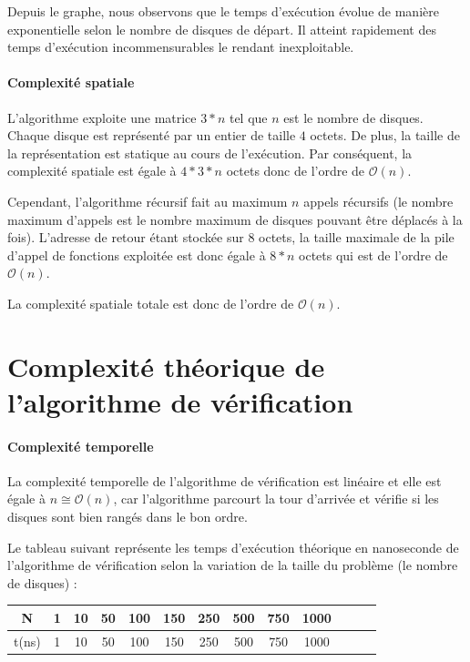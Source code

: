 Depuis le graphe, nous observons que le temps d'exécution évolue de manière exponentielle selon le nombre de disques de départ. Il atteint rapidement des temps d'exécution incommensurables le rendant inexploitable.

\paragraph{Complexité spatiale}
L'algorithme exploite une matrice $3 * n$ tel que $n$ est le nombre de disques. Chaque disque est représenté par un entier de taille $4$ octets. De plus, la taille de la représentation est statique au cours de l'exécution. Par conséquent, la complexité spatiale est égale à $4 * 3 * n$ octets donc de l'ordre de $\mathcal{O}(n)$.
\par
Cependant, l'algorithme récursif fait au maximum $n$ appels récursifs (le nombre maximum d'appels est le nombre maximum de disques pouvant être déplacés à la fois). L'adresse de retour étant stockée sur $8$ octets, la taille maximale de la pile d'appel de fonctions exploitée est donc égale à $8 * n$ octets qui est de l'ordre de $\mathcal{O}(n)$.
\par
La complexité spatiale totale est donc de l'ordre de $\mathcal{O}(n)$.

\section{Complexité théorique de l'algorithme de vérification}
\paragraph{Complexité temporelle}
La complexité temporelle de l'algorithme de vérification est linéaire et elle est égale à $n \cong \mathcal{O}(n)$, car l'algorithme parcourt la tour d'arrivée et vérifie si les disques sont bien rangés dans le bon ordre.
\par
Le tableau suivant représente les temps d'exécution théorique en nanoseconde de l'algorithme de vérification selon la variation de la taille du problème (le nombre de disques) :

\small
\begin{center}
    \begin{tabular}{| c | c | c | c | c | c | c | c | c | c | c | c | c |}
        \hline
        N & 1 & 10 & 50 & 100 & 150 & 250 & 500 & 750 & 1000\\
        \hline
        t(ns) & 1 & 10 & 50 & 100 & 150 & 250 & 500 & 750 & 1000\\
        \hline
    \end{tabular}
\end{center}

